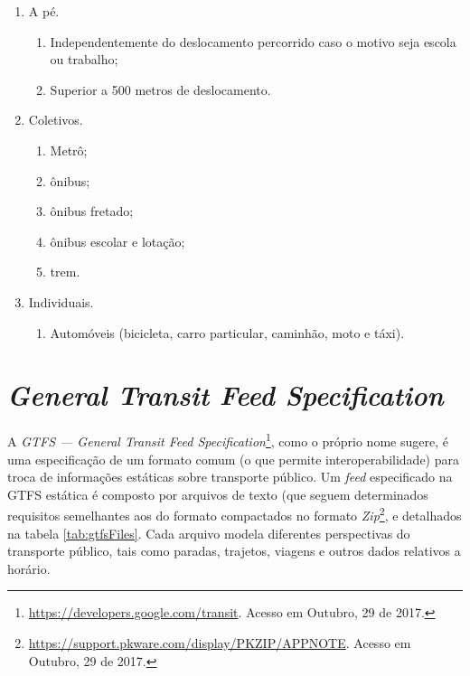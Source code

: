 \documentclass[
	12pt,				%
	oneside,			%
	a4paper,			%
	english,			%
	brazil				%
	]{abntex2ppgsi}
\begin{document}
\begin{enumerate}
\item A pé.
\begin{enumerate}
\item Independentemente do deslocamento percorrido caso o motivo seja escola ou trabalho;
\item  Superior a 500 metros de deslocamento.
\end{enumerate}
\item Coletivos.
\begin{enumerate}
\item Metrô;
\item ônibus;
\item ônibus fretado;
\item ônibus escolar e lotação;
\item trem.
\end{enumerate}
\item Individuais.
\begin{enumerate}
\item Automóveis (bicicleta, carro particular, caminhão, moto e táxi).
\end{enumerate}
\end{enumerate}


\section{\textit{General Transit Feed Specification}}
\label{gtfs}

A \textit{GTFS --- General Transit Feed Specification}\footnote{\label{googleTransit}\url{https://developers.google.com/transit}. Acesso em Outubro, 29 de 2017.}, como o próprio nome sugere, é uma especificação de um formato comum (o que permite interoperabilidade) para troca de informações estáticas sobre transporte público.  Um \textit{feed} especificado na GTFS estática é composto por arquivos de texto (que seguem determinados requisitos semelhantes aos do formato   compactados no formato \textit{Zip}\footnote{\url{https://support.pkware.com/display/PKZIP/APPNOTE}. Acesso em Outubro, 29 de 2017.}, e detalhados na tabela \ref{tab:gtfsFiles}. Cada arquivo modela diferentes perspectivas do transporte público, tais como paradas, trajetos, viagens e outros dados relativos a horário.
\end{document}
